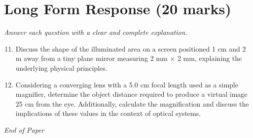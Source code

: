 \documentclass[12pt]{article}
\begin{document}
\section*{Long Form Response (20 marks)}
\textit{Answer each question with a clear and complete explanation.}
\begin{enumerate}[label=\arabic*.]
\setcounter{enumi}{10}
\item Discuss the shape of the illuminated area on a screen positioned 1 cm and 2 m away from a tiny plane mirror measuring 2 mm \ensuremath{\times} 2 mm, explaining the underlying physical principles.
\item Considering a converging lens with a 5.0 cm focal length used as a simple magnifier, determine the object distance required to produce a virtual image 25 cm from the eye. Additionally, calculate the magnification and discuss the implications of these values in the context of optical systems.
\end{enumerate}

\vfill
\noindent\textit{End of Paper}
\end{document}
